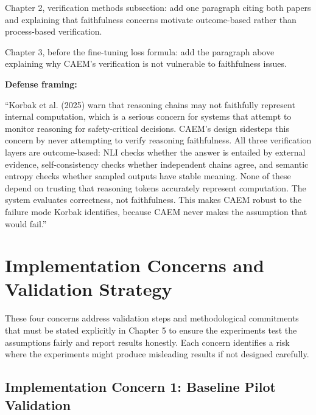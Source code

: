 \documentclass[11pt,a4paper]{article}
\begin{document}
{Chapter 2, verification methods subsection: add one paragraph citing both papers and explaining that faithfulness concerns motivate outcome-based rather than process-based verification.

Chapter 3, before the fine-tuning loss formula: add the paragraph above explaining why CAEM's verification is not vulnerable to faithfulness issues.

\textbf{Defense framing:}

``Korbak et al. (2025) warn that reasoning chains may not faithfully represent internal computation, which is a serious concern for systems that attempt to monitor reasoning for safety-critical decisions. CAEM's design sidesteps this concern by never attempting to verify reasoning faithfulness. All three verification layers are outcome-based: NLI checks whether the answer is entailed by external evidence, self-consistency checks whether independent chains agree, and semantic entropy checks whether sampled outputs have stable meaning. None of these depend on trusting that reasoning tokens accurately represent computation. The system evaluates correctness, not faithfulness. This makes CAEM robust to the failure mode Korbak identifies, because CAEM never makes the assumption that would fail.''
}

\newpage

\section{Implementation Concerns and Validation Strategy}
\label{sec:implementation}

These four concerns address validation steps and methodological commitments that must be stated explicitly in Chapter 5 to ensure the experiments test the assumptions fairly and report results honestly. Each concern identifies a risk where the experiments might produce misleading results if not designed carefully.

\subsection{Implementation Concern 1: Baseline Pilot Validation}
\end{document}
